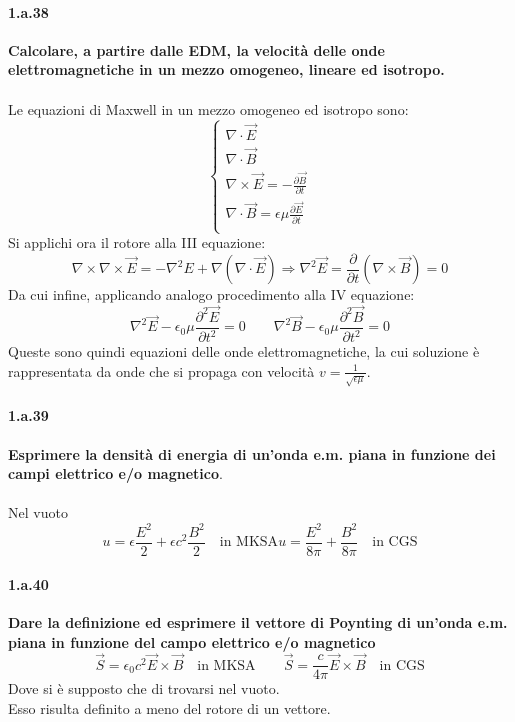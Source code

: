 \documentclass[twoside]{article}
\begin{document}
\paragraph{1.a.38} \textbf{Calcolare, a partire dalle EDM, la velocità delle onde elettromagnetiche in un
mezzo omogeneo, lineare ed isotropo.}\\
\\
Le equazioni di Maxwell in un mezzo omogeneo ed isotropo sono:
\begin{equation}
    \begin{cases}
    \nabla \cdot \vec{E}\\
    \nabla \cdot \Vec{B}\\
    \nabla \times \vec{E}=-\frac{\partial \vec{B}}{\partial t}\\
    \nabla \cdot \vec{B}=\epsilon\mu \frac{\partial \vec{E}}{\partial t}\\
    \end{cases}
\end{equation}
Si applichi ora il rotore alla III equazione:
\begin{equation}
    \nabla\times\nabla\times \vec{E}=-\nabla^2E+\nabla(\nabla\cdot \vec{E}) \Longrightarrow \nabla^2 \vec{E}=\frac{\partial }{\partial t} (\nabla \times \vec{B})=0
\end{equation}
Da cui infine, applicando analogo procedimento alla IV equazione:
\begin{equation}
    \nabla^2\vec{E}-\epsilon_0\mu\frac{\partial^2\vec{E}}{\partial t^2}=0 \qquad \nabla^2\vec{B}-\epsilon_0\mu\frac{\partial^2\vec{B}}{\partial t^2}=0
\end{equation}
Queste sono quindi equazioni delle onde elettromagnetiche, la cui soluzione è rappresentata da onde che si propaga con velocità $v=\frac{1}{\sqrt{\epsilon\mu}}$.
\paragraph{1.a.39} \textbf{Esprimere la densità di energia di un’onda e.m. piana in funzione dei campi elettrico e/o magnetico}.\\
\\
Nel vuoto
\begin{equation}
    u=\epsilon \frac{E^2}{2}+\epsilon c^2\frac{B^2}{2}  \quad \text{in MKSA} u= \frac{E^2}{8\pi}+\frac{B^2}{8\pi} \quad \text{in CGS}
\end{equation}

\paragraph{1.a.40}\textbf{ Dare la definizione ed esprimere il vettore di Poynting di un’onda e.m. piana in
funzione del campo elettrico e/o magnetico}\\
\begin{equation}
    \vec{S}=\epsilon_0 c^2\vec{E}\times \vec{B}\quad \text{in MKSA} \qquad \vec{S}=\frac{c}{4\pi}\vec{E}\times \vec{B} \quad \text{in CGS}
    \end{equation}
Dove si è supposto che di trovarsi nel vuoto.\\
Esso risulta definito a meno del rotore di un vettore.\\
\end{document}
